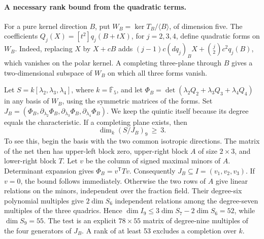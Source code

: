 \paragraph{A necessary rank bound from the quadratic terms.}
For a pure kernel direction \(B\), put
\(W_B=\ker T_B/\langle B\rangle\), of dimension five. The coefficients
\(Q_j(X)=[t^2]q_j(B+tX)\), for \(j=2,3,4\), define quadratic forms
on \(W_B\). Indeed, replacing \(X\) by \(X+cB\) adds
\((j-1)c(dq_j)_BX+\binom j2 c^2q_j(B)\), which vanishes on the
polar kernel. A completing three-plane through \(B\) gives a
two-dimensional subspace of \(W_B\) on which all three forms vanish.

Let \(S=k[\lambda_2,\lambda_3,\lambda_4]\), where
\(k=\overline{\mathbb F}_5\), and let
\(\Phi_B=\det(\lambda_2Q_2+\lambda_3Q_3+\lambda_4Q_4)\) in any
basis of \(W_B\), using the symmetric matrices of the forms. Set
\(J_B=(\Phi_B,\partial_{\lambda_2}\Phi_B,
\partial_{\lambda_3}\Phi_B,\partial_{\lambda_4}\Phi_B)\).
We keep the quintic itself because its degree equals the characteristic.
If a completing plane exists, then
\[
                 \dim_k(S/J_B)_9\ \geq\ 3 .
\]
To see this, begin the basis with the two common isotropic directions.
The matrix of the net then has upper-left block zero, upper-right block
\(A\) of size \(2\times3\), and lower-right block \(T\).
Let \(v\) be the column of signed maximal minors of \(A\).
Determinant expansion gives \(\Phi_B=v^{\mathsf T}Tv\).
Consequently \(J_B\subseteq I=(v_1,v_2,v_3)\). If \(v=0\), the
bound follows immediately. Otherwise the two rows of \(A\) give
linear relations on the minors, independent over the fraction field.
Their degree-six polynomial multiples give \(2\dim S_6\) independent
relations among the degree-seven multiples of the three quadrics.
Hence \(\dim I_9\le 3\dim S_7-2\dim S_6=52\), while
\(\dim S_9=55\). The test is an explicit \(78\times55\) matrix of
degree-nine multiples of the four generators of \(J_B\).
A rank of at least 53 excludes a completion over \(k\).

